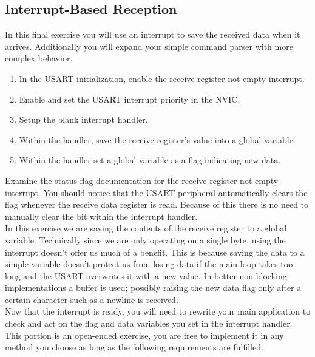 \documentclass[openany,11pt,fleqn]{book} %
\begin{document}
\subsection{Interrupt-Based Reception}
In this final exercise you will use an interrupt to save the received data when it arrives. Additionally you will expand your simple command parser with more complex behavior.

\begin{enumerate}
    \item In the USART initialization, enable the receive register not empty interrupt.
    \item Enable and set the USART interrupt priority in the NVIC.
    \item Setup the blank interrupt handler.
    \item Within the handler, save the receive register's value into a global variable.
    \item Within the handler set a global variable as a flag indicating new data. 
\end{enumerate} 

Examine the status flag documentation for the receive register not empty interrupt. You should notice that the USART peripheral automatically clears the flag whenever the receive data register is read. Because of this there is no need to manually clear the bit within the interrupt handler. \\

In this exercise we are saving the contents of the receive register to a global variable. Technically since we are only operating on a single byte, using the interrupt doesn't offer us much of a benefit. This is because saving the data to a simple variable doesn't protect us from losing data if the main loop takes too long and the USART overwrites it with a new value. In better non-blocking implementations a buffer is used; possibly raising the new data flag only after a certain character such as a newline is received.\\

Now that the interrupt is ready, you will need to rewrite your main application to check and act on the flag and data variables you set in the interrupt handler. This portion is an open-ended exercise, you are free to implement it in any method you choose as long as the following requirements are fulfilled. 
\end{document}
